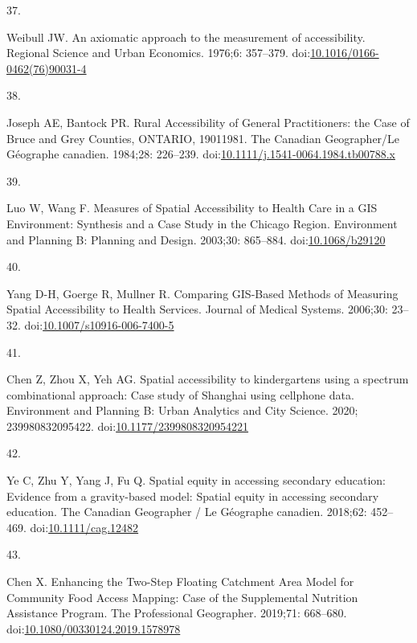 \documentclass[10pt,letterpaper]{article}
\newlength{\cslhangindent}
\newlength{\csllabelwidth}
\newlength{\cslentryspacingunit} %
\newenvironment{CSLReferences}[2] %
 {%
  \setlength{\parindent}{0pt}
  \ifodd #1
  \let\oldpar\par
  \def\par{\hangindent=\cslhangindent\oldpar}
  \fi
  \setlength{\parskip}{#2\cslentryspacingunit}
 }%
 {}
\newcommand{\CSLLeftMargin}[1]{\parbox[t]{\csllabelwidth}{#1}}
\newcommand{\CSLRightInline}[1]{\parbox[t]{\linewidth - \csllabelwidth}{#1}\break}
\begin{document}
\begin{CSLReferences}{0}{0}
\leavevmode{}%
\CSLLeftMargin{37. }%
\CSLRightInline{Weibull JW. An axiomatic approach to the measurement of
accessibility. Regional Science and Urban Economics. 1976;6: 357--379.
doi:\href{https://doi.org/10.1016/0166-0462(76)90031-4}{10.1016/0166-0462(76)90031-4}}

\leavevmode{}%
\CSLLeftMargin{38. }%
\CSLRightInline{Joseph AE, Bantock PR. Rural Accessibility of General
Practitioners: the Case of Bruce and Grey Counties, ONTARIO,
1901{\textendash}1981. The Canadian Geographer/Le Géographe canadien.
1984;28: 226--239.
doi:\href{https://doi.org/10.1111/j.1541-0064.1984.tb00788.x}{10.1111/j.1541-0064.1984.tb00788.x}}

\leavevmode{}%
\CSLLeftMargin{39. }%
\CSLRightInline{Luo W, Wang F. Measures of Spatial Accessibility to
Health Care in a GIS Environment: Synthesis and a Case Study in the
Chicago Region. Environment and Planning B: Planning and Design.
2003;30: 865--884.
doi:\href{https://doi.org/10.1068/b29120}{10.1068/b29120}}

\leavevmode{}%
\CSLLeftMargin{40. }%
\CSLRightInline{Yang D-H, Goerge R, Mullner R. Comparing {GIS}-{Based}
{Methods} of {Measuring} {Spatial} {Accessibility} to {Health}
{Services}. Journal of Medical Systems. 2006;30: 23--32.
doi:\href{https://doi.org/10.1007/s10916-006-7400-5}{10.1007/s10916-006-7400-5}}

\leavevmode{}%
\CSLLeftMargin{41. }%
\CSLRightInline{Chen Z, Zhou X, Yeh AG. Spatial accessibility to
kindergartens using a spectrum combinational approach: {Case} study of
{Shanghai} using cellphone data. Environment and Planning B: Urban
Analytics and City Science. 2020; 239980832095422.
doi:\href{https://doi.org/10.1177/2399808320954221}{10.1177/2399808320954221}}

\leavevmode{}%
\CSLLeftMargin{42. }%
\CSLRightInline{Ye C, Zhu Y, Yang J, Fu Q. Spatial equity in accessing
secondary education: {Evidence} from a gravity-based model: {Spatial}
equity in accessing secondary education. The Canadian Geographer / Le
Géographe canadien. 2018;62: 452--469.
doi:\href{https://doi.org/10.1111/cag.12482}{10.1111/cag.12482}}

\leavevmode{}%
\CSLLeftMargin{43. }%
\CSLRightInline{Chen X. Enhancing the {Two}-{Step} {Floating}
{Catchment} {Area} {Model} for {Community} {Food} {Access} {Mapping}:
{Case} of the {Supplemental} {Nutrition} {Assistance} {Program}. The
Professional Geographer. 2019;71: 668--680.
doi:\href{https://doi.org/10.1080/00330124.2019.1578978}{10.1080/00330124.2019.1578978}}


\end{CSLReferences}
\end{document}
